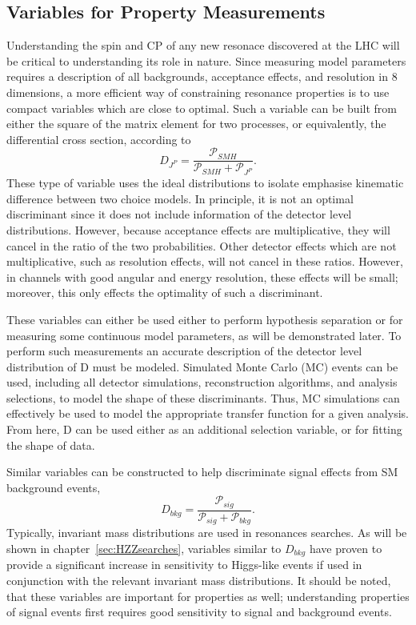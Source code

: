 \subsection{Variables for Property Measurements}
\label{sec:Spin-parity}

Understanding the spin and CP of any new resonace discovered at the LHC
will be critical to understanding its role in nature.  Since measuring 
model parameters requires a description of all backgrounds, acceptance
effects, and resolution in 8 dimensions, a more efficient way of
constraining resonance properties is to use compact variables which are
close to optimal.  Such a variable can be built from either the 
square of the matrix element for two processes, or equivalently, the
differential cross section, according to
\begin{equation}
D_{J^P} = \frac{\mathscr{P}_{SMH}}{\mathscr{P}_{SMH}+\mathscr{P}_{J^{P}}}.
\label{eq:KD}
\end{equation}
These type of variable uses the ideal distributions to isolate emphasise
kinematic difference between two choice models.  In principle, it is not
an optimal discriminant since it does not include information of the 
detector level distributions.  However, because acceptance effects are 
multiplicative, they will cancel in the ratio of the two probabilities.
Other detector effects which are not multiplicative, such as resolution
effects, will not cancel in these ratios.  However, in channels with 
good angular and energy resolution, these effects will be small; moreover,
this only effects the optimality of such a discriminant.

These variables can either be used either to perform hypothesis separation
or for measuring some continuous model parameters, as will be demonstrated 
later.  To perform such measurements an accurate description of the detector 
level distribution of D must be modeled.  Simulated Monte Carlo (MC)
events can be used, including all detector simulations, reconstruction
algorithms, and analysis selections, to model the shape of these discriminants.
Thus, MC simulations can effectively be used to model the appropriate 
transfer function for a given analysis.  From here, D can be used either 
as an additional selection variable, or for fitting the shape of data. 

Similar variables can be constructed to help discriminate signal effects 
from SM background events,
\begin{equation}
D_{bkg} = \frac{\mathscr{P}_{sig}}{\mathscr{P}_{sig}+\mathscr{P}_{bkg}}.
\end{equation}
Typically, invariant mass distributions are used in resonances searches. 
As will be shown in chapter~\ref{sec:HZZsearches}, variables similar to 
$D_{bkg}$ have proven to provide a significant increase in sensitivity to 
Higgs-like events if used in conjunction with the relevant invariant
mass distributions.  It should be noted, that these variables are important
for properties as well; understanding properties of signal events first
requires good sensitivity to signal and background events.  

